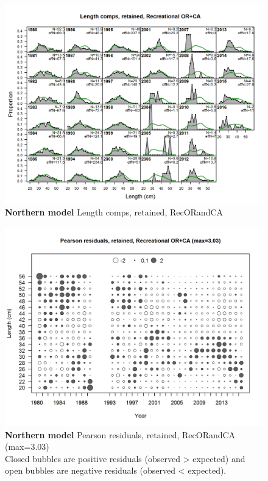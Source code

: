 \documentclass[12pt,]{article}
\begin{document}
\begin{figure}[htbp]
\centering
\includegraphics{./r4ss/plots_mod1/comp_lenfit_flt3mkt2.png}
\caption{\textbf{Northern model} Length comps, retained, RecORandCA
\label{fig:mod1_14_comp_lenfit_flt3mkt2}}
\end{figure}

\begin{figure}[htbp]
\centering
\includegraphics{./r4ss/plots_mod1/comp_lenfit_residsflt3mkt2.png}
\caption{\textbf{Northern model} Pearson residuals, retained, RecORandCA
(max=3.03)\\
Closed bubbles are positive residuals (observed \textgreater{} expected)
and open bubbles are negative residuals (observed \textless{} expected).
\label{fig:mod1_15_comp_lenfit_residsflt3mkt2}}
\end{figure}
\end{document}
